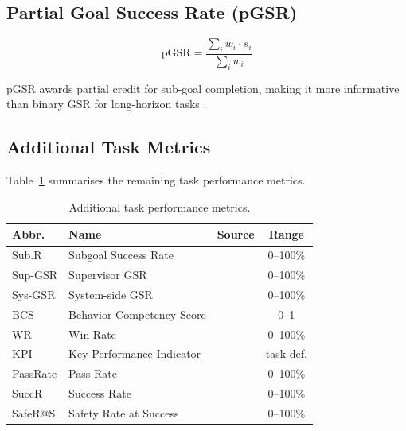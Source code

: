 \documentclass[11pt,a4paper]{article}
\begin{document}
\subsection{Partial Goal Success Rate (pGSR)}

\begin{equation}
  \text{pGSR} = \frac{\sum_{i} w_i \cdot s_i}{\sum_{i} w_i}
\end{equation}

pGSR awards partial credit for sub-goal completion, making it more informative than
binary GSR for long-horizon tasks \citep{maseval2025}.

\subsection{Additional Task Metrics}

Table~\ref{tab:task_metrics} summarises the remaining task performance metrics.

\begin{table}[h!]
  \centering
  \caption{Additional task performance metrics.}
  \label{tab:task_metrics}
  \small
  \begin{tabular}{lllc}
    \toprule
    \textbf{Abbr.} & \textbf{Name} & \textbf{Source} & \textbf{Range} \\
    \midrule
    Sub.R    & Subgoal Success Rate      & \citet{comm_verify2025}  & 0--100\%  \\
    Sup-GSR  & Supervisor GSR            & \citet{aws_bedrock2024}  & 0--100\%  \\
    Sys-GSR  & System-side GSR           & \citet{aws_bedrock2024}  & 0--100\%  \\
    BCS      & Behavior Competency Score & \citet{crew_wildfire2025}& 0--1      \\
    WR       & Win Rate                  & \citet{magic2023}        & 0--100\%  \\
    KPI      & Key Performance Indicator & \citet{marble2025}       & task-def. \\
    PassRate & Pass Rate                 & \citet{mobile_bench2024} & 0--100\%  \\
    SuccR    & Success Rate              & \citet{safe_beal2025}    & 0--100\%  \\
    SafeR@S  & Safety Rate at Success    & \citet{safe_beal2025}    & 0--100\%  \\
    \bottomrule
  \end{tabular}
\end{table}
\end{document}
